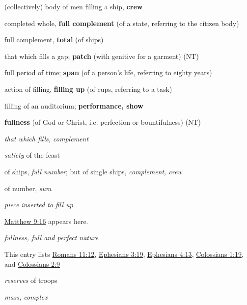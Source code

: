 \begin{compactdesc}
\begin{compactitem}
							\item[3] (collectively) body of men filling a ship, \textbf{crew}
							\item[4] completed whole, \textbf{full complement} (of a state, referring to the citizen body)
							\item[5] full complement, \textbf{total} (of ships)
							\item[6] that which fills a gap; \textbf{patch} (with genitive for a garment) (NT)
							\item[7] full period of time; \textbf{span} (of a person's life, referring to eighty years)
							\item[8] action of filling, \textbf{filling up} (of cups, referring to a task)
							\item[9] filling of an auditorium; \textbf{performance, show}
							\item[10] \textbf{fullness} (of God or Christ, i.e. perfection or bountifulness) (NT)
						\end{compactitem}
					\item[LSJ 1420a, PDF 1491] \textbf{}
						\begin{compactitem}
							\item[I.1] \textit{that which fills, complement}
							\item[I.2] \textit{satiety} of the feast
							\item[I.3] of ships, \textit{full number}; but of single ships, \textit{complement, crew}
							\item[I.4] of number, \textit{sum}
							\item[I.5] \textit{piece inserted to fill up}
								\begin{compactitem}
									\item \hyperref[MATTHEW-9-16]{Matthew 9:16} appears here.
								\end{compactitem}
							\item[I.6] \textit{fullness, full and perfect nature}
								\begin{compactitem}
									\item This entry lists \hyperref[ROMANS-11-12]{Romans 11:12}, \hyperref[EPHESIANS-3-19]{Ephesians 3:19}, \hyperref[EPHESIANS-4-13]{Ephesians 4:13}, \hyperref[COLOSSIANS-1-19]{Colossians 1:19}, and \hyperref[COLOSSIANS-2-9]{Colossians 2:9}
								\end{compactitem}
							\item[I.7] \textit{reserves} of troops
							\item[I.8] \textit{mass, complex}

\end{compactitem}
\end{compactdesc}

